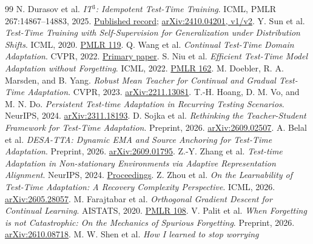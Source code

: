 \documentclass[11pt,a4paper]{article}
\begin{document}
\begin{thebibliography}{99}\small
{} N. Durasov et al. \emph{IT$^3$: Idempotent Test-Time Training}.
ICML, PMLR 267:14867--14883, 2025.
\href{https://proceedings.mlr.press/v267/durasov25a.html}{Published record};
\href{https://arxiv.org/abs/2410.04201}{arXiv:2410.04201, v1/v2}.
 Y. Sun et al. \emph{Test-Time Training with Self-Supervision
for Generalization under Distribution Shifts}. ICML, 2020.
\href{https://proceedings.mlr.press/v119/sun20b.html}{PMLR 119}.
 Q. Wang et al. \emph{Continual Test-Time Domain Adaptation}.
CVPR, 2022.
\href{https://openaccess.thecvf.com/content/CVPR2022/html/Wang_Continual_Test-Time_Domain_Adaptation_CVPR_2022_paper.html}{Primary paper}.
 S. Niu et al. \emph{Efficient Test-Time Model Adaptation
without Forgetting}. ICML, 2022.
\href{https://proceedings.mlr.press/v162/niu22a.html}{PMLR 162}.
 M. Doebler, R. A. Marsden, and B. Yang. \emph{Robust Mean
Teacher for Continual and Gradual Test-Time Adaptation}. CVPR, 2023.
\href{https://arxiv.org/abs/2211.13081}{arXiv:2211.13081}.
 T.-H. Hoang, D. M. Vo, and M. N. Do. \emph{Persistent
Test-time Adaptation in Recurring Testing Scenarios}. NeurIPS, 2024.
\href{https://arxiv.org/abs/2311.18193}{arXiv:2311.18193}.
 D. Sojka et al. \emph{Rethinking the Teacher-Student
Framework for Test-Time Adaptation}. Preprint, 2026.
\href{https://arxiv.org/abs/2609.02507}{arXiv:2609.02507}.
 A. Belal et al. \emph{DESA-TTA: Dynamic EMA and Source
Anchoring for Test-Time Adaptation}. Preprint, 2026.
\href{https://arxiv.org/abs/2609.01795}{arXiv:2609.01795}.
 Z.-Y. Zhang et al. \emph{Test-time Adaptation in
Non-stationary Environments via Adaptive Representation Alignment}.
NeurIPS, 2024.
\href{https://papers.neurips.cc/paper_files/paper/2024/hash/abe31a12e83111fdf2cfd54deed5a2ce-Abstract-Conference.html}{Proceedings}.
 Z. Zhou et al. \emph{On the Learnability of Test-Time
Adaptation: A Recovery Complexity Perspective}. ICML, 2026.
\href{https://arxiv.org/abs/2605.28057}{arXiv:2605.28057}.
 M. Farajtabar et al. \emph{Orthogonal Gradient Descent for
Continual Learning}. AISTATS, 2020.
\href{https://proceedings.mlr.press/v108/farajtabar20a.html}{PMLR 108}.
 V. Palit et al. \emph{When Forgetting is not Catastrophic:
On the Mechanics of Spurious Forgetting}. Preprint, 2026.
\href{https://arxiv.org/abs/2610.08718}{arXiv:2610.08718}.
 M. W. Shen et al. \emph{How I learned to stop worrying
}
\end{thebibliography}
\end{document}
